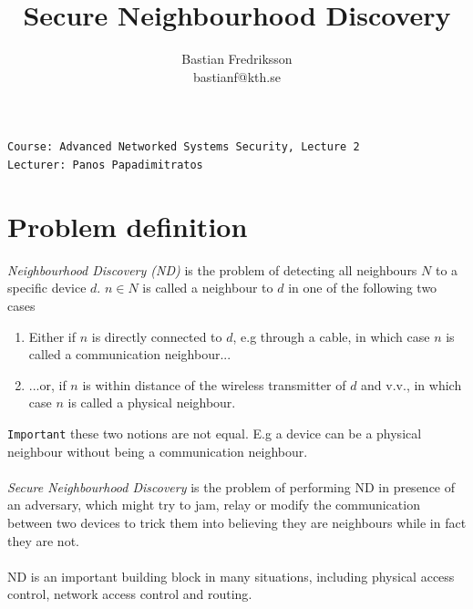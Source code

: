 \documentclass{article}
\title{Secure Neighbourhood Discovery}
\author{Bastian Fredriksson\\bastianf@kth.se}
\begin{document}
\maketitle

\noindent
\verb!Course: Advanced Networked Systems Security, Lecture 2!\\
\verb!Lecturer: Panos Papadimitratos!

\section{Problem definition}
\textit{Neighbourhood Discovery (ND)} is the problem of detecting all neighbours $N$ to a specific device $d$. $n \in N$ is called a neighbour to $d$ in one of the following two cases
\begin{enumerate}
    \item Either if $n$ is directly connected to $d$, e.g through a cable, in which case $n$ is called a communication neighbour...
    \item ...or, if $n$ is within distance of the wireless transmitter of $d$ and v.v., in which case $n$ is called a physical neighbour.
\end{enumerate}
\verb!Important! these two notions are not equal. E.g a device can be a physical neighbour without being a communication neighbour.
\\
\\
\textit{Secure Neighbourhood Discovery} is the problem of performing ND in presence of an adversary, which might try to jam, relay or modify the communication between two devices to trick them into believing they are neighbours while in fact they are not. 
\\
\\
ND is an important building block in many situations, including physical access control, network access control and routing\cite{PapadiPSL:J:08}.
\clearpage
\end{document}
